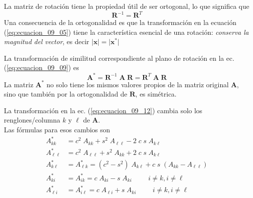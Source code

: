 \begin{frame}
La matriz de rotación tiene la propiedad útil de ser ortogonal, lo que significa que
\begin{equation}
\mathbf{R}^{-1} = \mathbf{R}^{T}
\label{eq:ecuacion_09_11}
\end{equation}
Una consecuencia de la ortogonalidad es que la transformación en la ecuación (\ref{eq:ecuacion_09_05}) tiene la característica esencial de una rotación: \emph{conserva la magnitud del vector}, es decir $\vert \mathbf{x} \vert = \vert \mathbf{x}^{*} \vert$
\end{frame}
\begin{frame}
La transformación de similitud correspondiente al plano de rotación en la ec. (\ref{eq:ecuacion_09_09}) es
\begin{equation}
\mathbf{A}^{*} = \mathbf{R}^{-1} \; \mathbf{A \; R} = \mathbf{R}^{T} \; \mathbf{A \; R}
\label{eq:ecuacion_09_12}
\end{equation}
\pause
La matriz $\mathbf{A}^{*}$ no solo tiene los mismos valores propios de la matriz original $\mathbf{A}$, sino que también por la ortogonalidad de $\mathbf{R}$, es simétrica.
\end{frame}
\begin{frame}
La transformación en la ec. (\ref{eq:ecuacion_09_12}) cambia solo los renglones/columna $k$ y $\ell$ de $\mathbf{A}$.
\\
\bigskip
Las fórmulas para esos cambios son
\fontsize{12}{12}\selectfont
\begin{equation}
\begin{aligned}
A_{k k}^{*} &= c^{2} \; A_{k k} + s^{2} \; A_{\ell \ell} - 2 \; c \; s \; A_{k \ell} \\
A_{\ell \ell}^{*} &= c^{2} \; A_{\ell \ell} + s^{2} \; A_{k k} + 2 \; c \; s \; A_{k \ell} \\
A_{k \ell}^{*} &= A_{\ell k}^{*} = (c^{2} - s^{2}) \; A_{k \ell} + c \; s \; (A_{k k} - A_{\ell \ell}) \\
A_{k i}^{*} &= A_{i k}^{*} = c \; A_{k i } - s \; A_{k i} \hspace{1cm} i \neq k, i \neq \ell \\
A_{\ell i}^{*} &= A_{i \ell}^{*} = c \; A_{\ell i } + s \; A_{k i} \hspace{1cm} i \neq k, i \neq \ell
\end{aligned}
\label{eq:ecuacion_09_13}
\end{equation}
\end{frame}

